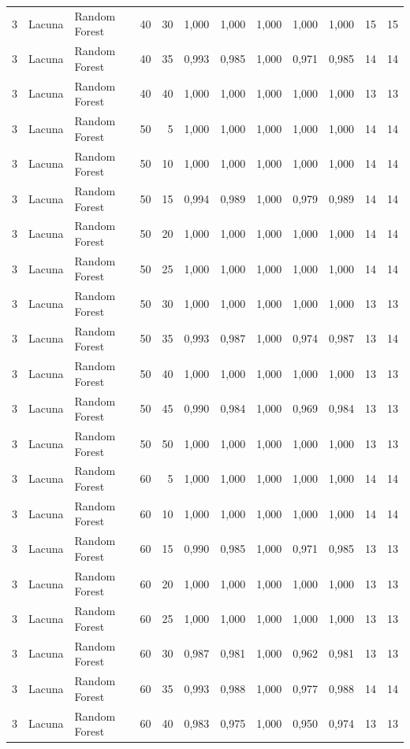 \begin{longtable}{@{}rllrrrrrrrrr@{}}
3 & Lacuna & Random Forest & 40 & 30 & 1,000 & 1,000 & 1,000 & 1,000 & 1,000 & 15 & 15 \\
3 & Lacuna & Random Forest & 40 & 35 & 0,993 & 0,985 & 1,000 & 0,971 & 0,985 & 14 & 14 \\
3 & Lacuna & Random Forest & 40 & 40 & 1,000 & 1,000 & 1,000 & 1,000 & 1,000 & 13 & 13 \\
3 & Lacuna & Random Forest & 50 & 5 & 1,000 & 1,000 & 1,000 & 1,000 & 1,000 & 14 & 14 \\
3 & Lacuna & Random Forest & 50 & 10 & 1,000 & 1,000 & 1,000 & 1,000 & 1,000 & 14 & 14 \\
3 & Lacuna & Random Forest & 50 & 15 & 0,994 & 0,989 & 1,000 & 0,979 & 0,989 & 14 & 14 \\
3 & Lacuna & Random Forest & 50 & 20 & 1,000 & 1,000 & 1,000 & 1,000 & 1,000 & 14 & 14 \\
3 & Lacuna & Random Forest & 50 & 25 & 1,000 & 1,000 & 1,000 & 1,000 & 1,000 & 14 & 14 \\
3 & Lacuna & Random Forest & 50 & 30 & 1,000 & 1,000 & 1,000 & 1,000 & 1,000 & 13 & 13 \\
3 & Lacuna & Random Forest & 50 & 35 & 0,993 & 0,987 & 1,000 & 0,974 & 0,987 & 13 & 14 \\
3 & Lacuna & Random Forest & 50 & 40 & 1,000 & 1,000 & 1,000 & 1,000 & 1,000 & 13 & 13 \\
3 & Lacuna & Random Forest & 50 & 45 & 0,990 & 0,984 & 1,000 & 0,969 & 0,984 & 13 & 13 \\
3 & Lacuna & Random Forest & 50 & 50 & 1,000 & 1,000 & 1,000 & 1,000 & 1,000 & 13 & 13 \\
3 & Lacuna & Random Forest & 60 & 5 & 1,000 & 1,000 & 1,000 & 1,000 & 1,000 & 14 & 14 \\
3 & Lacuna & Random Forest & 60 & 10 & 1,000 & 1,000 & 1,000 & 1,000 & 1,000 & 14 & 14 \\
3 & Lacuna & Random Forest & 60 & 15 & 0,990 & 0,985 & 1,000 & 0,971 & 0,985 & 13 & 13 \\
3 & Lacuna & Random Forest & 60 & 20 & 1,000 & 1,000 & 1,000 & 1,000 & 1,000 & 13 & 13 \\
3 & Lacuna & Random Forest & 60 & 25 & 1,000 & 1,000 & 1,000 & 1,000 & 1,000 & 13 & 13 \\
3 & Lacuna & Random Forest & 60 & 30 & 0,987 & 0,981 & 1,000 & 0,962 & 0,981 & 13 & 13 \\
3 & Lacuna & Random Forest & 60 & 35 & 0,993 & 0,988 & 1,000 & 0,977 & 0,988 & 14 & 14 \\
3 & Lacuna & Random Forest & 60 & 40 & 0,983 & 0,975 & 1,000 & 0,950 & 0,974 & 13 & 13 \\

\end{longtable}
